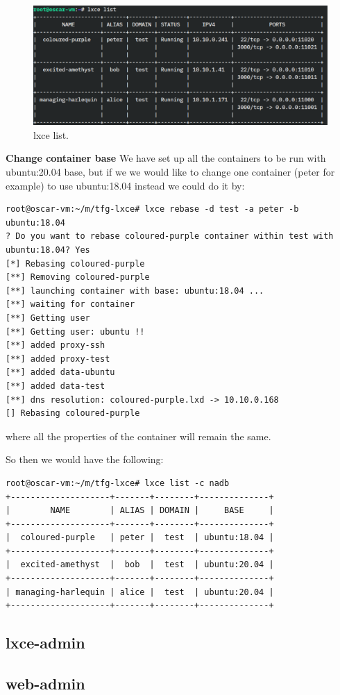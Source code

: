\begin{figure}[H]
\label{fig:lxce list}
\centering
\includegraphics[width=\textwidth]{img/04/lxce-list.pdf}
\caption[Prototype setup]{\footnotesize{lxce list.}}
\end{figure}

\textbf{Change container base}
We have set up all the containers to be run with ubuntu:20.04 base, but if we we would like to change one container (peter for example) to use ubuntu:18.04 instead we could do it by:
\begin{verbatim}
root@oscar-vm:~/m/tfg-lxce# lxce rebase -d test -a peter -b ubuntu:18.04
? Do you want to rebase coloured-purple container within test with ubuntu:18.04? Yes
[*] Rebasing coloured-purple
[**] Removing coloured-purple
[**] launching container with base: ubuntu:18.04 ...
[**] waiting for container
[**] Getting user
[**] Getting user: ubuntu !!
[**] added proxy-ssh
[**] added proxy-test
[**] added data-ubuntu
[**] added data-test
[**] dns resolution: coloured-purple.lxd -> 10.10.0.168
[] Rebasing coloured-purple
\end{verbatim}
where all the properties of the container will remain the same.

So then we would have the following:
\begin{verbatim}
root@oscar-vm:~/m/tfg-lxce# lxce list -c nadb
+--------------------+-------+--------+--------------+
|        NAME        | ALIAS | DOMAIN |     BASE     |
+--------------------+-------+--------+--------------+
|  coloured-purple   | peter |  test  | ubuntu:18.04 |
+--------------------+-------+--------+--------------+
|  excited-amethyst  |  bob  |  test  | ubuntu:20.04 |
+--------------------+-------+--------+--------------+
| managing-harlequin | alice |  test  | ubuntu:20.04 |
+--------------------+-------+--------+--------------+
\end{verbatim}

\subsection{lxce-admin}
\subsection{web-admin}



